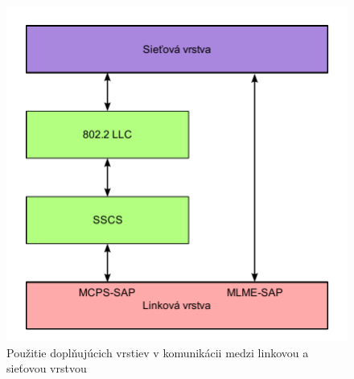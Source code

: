 \begin{figure}[htbp]
\begin{center}
\includegraphics[width=120mm]{figures/architecture_sublayers}
\caption{Použitie doplňujúcich vrstiev v komunikácii medzi linkovou a sieťovou vrstvou}
\label{fig:architecture_sublayers}
\end{center}
\end{figure}